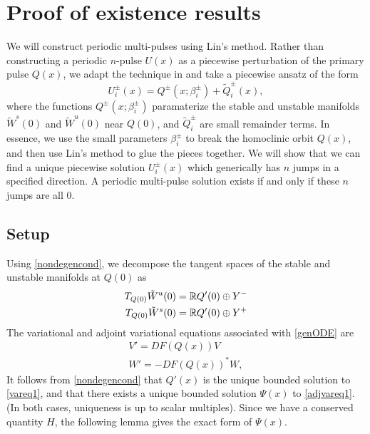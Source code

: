 \documentclass[10pt,reqno]{amsart}
\theoremstyle{plain}
\theoremstyle{definition}
\theoremstyle{remark}
\numberwithin{theorem}{section}
\numberwithin{equation}{section}
\begin{document}
\section{Proof of existence results}\label{sec:existproof}

We will construct periodic multi-pulses using Lin's method. Rather than constructing a periodic $n$-pulse $U(x)$ as a piecewise perturbation of the primary pulse $Q(x)$, we adapt the technique in \cite{Sandstede1997} and take a piecewise ansatz of the form
\[
U_i^\pm(x) = Q^\pm(x; \beta_i^\pm) + \tilde{Q}_i^\pm(x),
\]
where the functions $Q^\pm(x; \beta_i^\pm)$ paramaterize the stable and unstable manifolds $\tilde{W}^s(0)$ and $\tilde{W}^u(0)$ near $Q(0)$, and $\tilde{Q}_i^\pm$ are small remainder terms. In essence, we use the small parameters $\beta_i^\pm$ to break the homoclinic orbit $Q(x)$, and then use Lin's method to glue the pieces together. We will show that we can find a unique piecewise solution $U_i^\pm(x)$ which generically has $n$ jumps in a specified direction. A periodic multi-pulse solution exists if and only if these $n$ jumps are all 0.

\subsection{Setup}

Using \cref{nondegencond}, we decompose the tangent spaces of the stable and unstable manifolds at $Q(0)$ as 
\begin{equation*}
\begin{aligned}
T_{Q(0)}\tilde{W}^u(0) &= \mathbb{R} Q'(0) \oplus Y^- \\
T_{Q(0)}\tilde{W}^s(0) &= \mathbb{R} Q'(0) \oplus Y^+
\end{aligned}
\end{equation*}
The variational and adjoint variational equations associated with \cref{genODE} are
\begin{align}
V' = DF(Q(x)) V \label{vareq1} \\
W' = -DF(Q(x))^* W \label{adjvareq1},
\end{align}
It follows from \cref{nondegencond} that $Q'(x)$ is the unique bounded solution to \cref{vareq1}, and that there exists a unique bounded solution $\Psi(x)$ to \cref{adjvareq1}. (In both cases, uniqueness is up to scalar multiples). Since we have a conserved quantity $H$, the following lemma gives the exact form of $\Psi(x)$.
\end{document}
